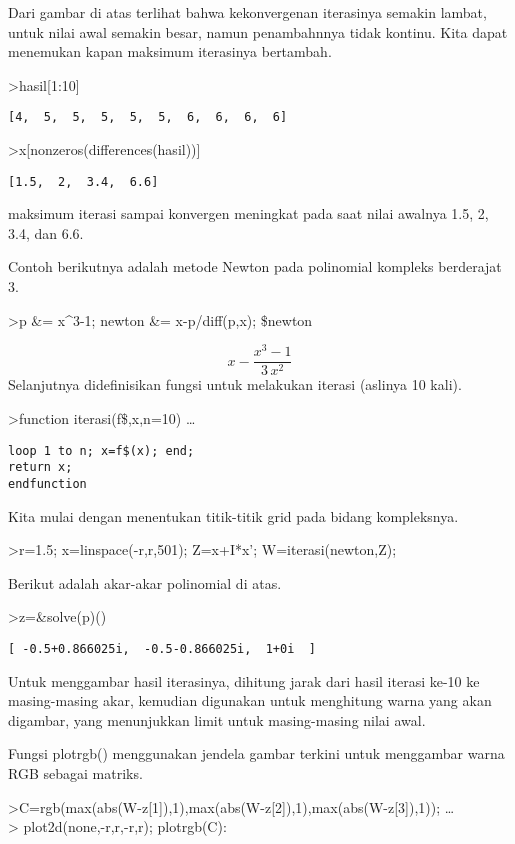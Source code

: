 \documentclass[
]{book}
\begin{document}
Dari gambar di atas terlihat bahwa kekonvergenan iterasinya semakin lambat, untuk nilai awal semakin besar, namun penambahnnya tidak kontinu. Kita dapat menemukan kapan maksimum iterasinya bertambah.

\textgreater hasil{[}1:10{]}

\begin{verbatim}
[4,  5,  5,  5,  5,  5,  6,  6,  6,  6]
\end{verbatim}

\textgreater x{[}nonzeros(differences(hasil)){]}

\begin{verbatim}
[1.5,  2,  3.4,  6.6]
\end{verbatim}

maksimum iterasi sampai konvergen meningkat pada saat nilai awalnya 1.5, 2, 3.4, dan 6.6.

Contoh berikutnya adalah metode Newton pada polinomial kompleks berderajat 3.

\textgreater p \&= x\^{}3-1; newton \&= x-p/diff(p,x); \$newton

\[x-\frac{x^3-1}{3\,x^2}\]Selanjutnya didefinisikan fungsi untuk melakukan iterasi (aslinya 10 kali).

\textgreater function iterasi(f\$,x,n=10) \ldots{}

\begin{verbatim}
loop 1 to n; x=f$(x); end;
return x;
endfunction
\end{verbatim}

Kita mulai dengan menentukan titik-titik grid pada bidang kompleksnya.

\textgreater r=1.5; x=linspace(-r,r,501); Z=x+I*x'; W=iterasi(newton,Z);

Berikut adalah akar-akar polinomial di atas.

\textgreater z=\&solve(p)()

\begin{verbatim}
[ -0.5+0.866025i,  -0.5-0.866025i,  1+0i  ]
\end{verbatim}

Untuk menggambar hasil iterasinya, dihitung jarak dari hasil iterasi ke-10 ke masing-masing akar, kemudian digunakan untuk menghitung warna yang akan digambar, yang menunjukkan limit untuk masing-masing nilai awal.

Fungsi plotrgb() menggunakan jendela gambar terkini untuk menggambar warna RGB sebagai matriks.

\textgreater C=rgb(max(abs(W-z{[}1{]}),1),max(abs(W-z{[}2{]}),1),max(abs(W-z{[}3{]}),1)); \ldots{}\\
\textgreater{} plot2d(none,-r,r,-r,r); plotrgb(C):
\end{document}
